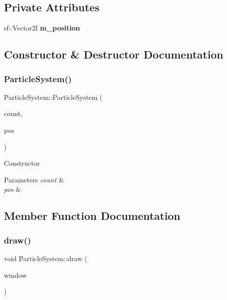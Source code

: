 \subsection*{Private Attributes}
\begin{DoxyCompactItemize}
\item 
\mbox{\label{class_particle_system_ad50a58285f679fb7935181ba7b31dd6b}} 
sf\+::\+Vector2f {\bfseries m\+\_\+position}
\end{DoxyCompactItemize}


\subsection{Constructor \& Destructor Documentation}
\mbox{\label{class_particle_system_a5b2793951c242cf0991ed50b9824041f}} 
\subsubsection{\texorpdfstring{ParticleSystem()}{ParticleSystem()}}
{\footnotesize\ttfamily Particle\+System\+::\+Particle\+System (\begin{DoxyParamCaption}\item[{int}]{count,  }\item[{sf\+::\+Vector2f}]{pos }\end{DoxyParamCaption})}



Constructor 


\begin{DoxyParams}{Parameters}
{\em count} & \\
\hline
{\em pos} & \\
\hline
\end{DoxyParams}


\subsection{Member Function Documentation}
\mbox{\label{class_particle_system_abfd6c818710949c3dd4f5dc891f62edc}} 
\subsubsection{\texorpdfstring{draw()}{draw()}}
{\footnotesize\ttfamily void Particle\+System\+::draw (\begin{DoxyParamCaption}\item[{sf\+::\+Render\+Window \&}]{window }\end{DoxyParamCaption})}



